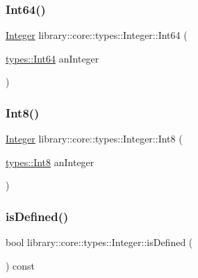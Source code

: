 \subsubsection{\texorpdfstring{Int64()}{Int64()}}
{\footnotesize\ttfamily \hyperlink{classlibrary_1_1core_1_1types_1_1_integer}{Integer} library\+::core\+::types\+::\+Integer\+::\+Int64 (\begin{DoxyParamCaption}\item[{\hyperlink{namespacelibrary_1_1core_1_1types_aaa5045e0d51ac9cff3c0aeff2b792c8c}{types\+::\+Int64}}]{an\+Integer }\end{DoxyParamCaption})\hspace{0.3cm}{\ttfamily [static]}}

\mbox{\label{classlibrary_1_1core_1_1types_1_1_integer_ae0a1da7739a3990f61ee8a56b3f4cd6a}} 
\subsubsection{\texorpdfstring{Int8()}{Int8()}}
{\footnotesize\ttfamily \hyperlink{classlibrary_1_1core_1_1types_1_1_integer}{Integer} library\+::core\+::types\+::\+Integer\+::\+Int8 (\begin{DoxyParamCaption}\item[{\hyperlink{namespacelibrary_1_1core_1_1types_a31bb31acb8e07271b66571cf8e6eafee}{types\+::\+Int8}}]{an\+Integer }\end{DoxyParamCaption})\hspace{0.3cm}{\ttfamily [static]}}

\mbox{\label{classlibrary_1_1core_1_1types_1_1_integer_a5edecf8abe00a8de9e021b8cc2b38c25}} 
\subsubsection{\texorpdfstring{is\+Defined()}{isDefined()}}
{\footnotesize\ttfamily bool library\+::core\+::types\+::\+Integer\+::is\+Defined (\begin{DoxyParamCaption}{ }\end{DoxyParamCaption}) const}

